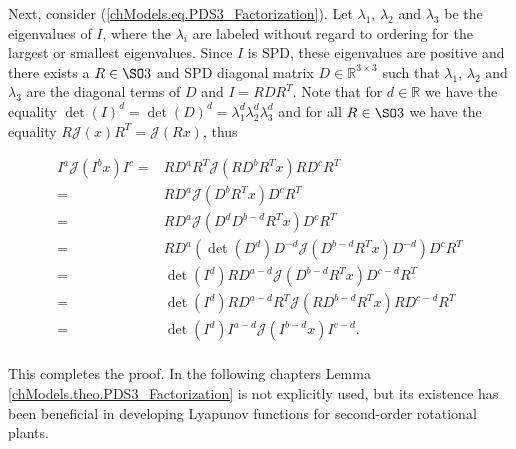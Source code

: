 \noindent Next, consider (\ref{chModels.eq.PDS3_Factorization}). Let $\lambda_1$,
$\lambda_2$ and $\lambda_3$ be the eigenvalues of $I$, where the
$\lambda_i$ are labeled without regard to ordering for the largest or
smallest eigenvalues. Since $I$ is \ac{SPD}, these eigenvalues are
positive and there exists a $R\in\SO3$ and \ac{SPD} diagonal matrix
$D\in\mathbb{R}^{3 \times 3}$ such that $\lambda_1$, $\lambda_2$ and
$\lambda_3$ are the diagonal terms of $D$ and $I=RDR^T$. Note that for
$d\in\mathbb{R}$ we have the equality
$\det(I)^d=\det(D)^d=\lambda_1^d\lambda_2^d\lambda_3^d$ and for all
$R\in\SO3$ we have the equality
$R\mathcal{J}\left(x\right)R^T=\mathcal{J}\left(Rx\right)$, thus

\begin{align}
I^a\mathcal{J}\left(I^b x\right)I^c
  =& RD^aR^T\mathcal{J}\left(RD^bR^T x\right)RD^cR^T
\nonumber \\
  =& RD^a\mathcal{J}\left(D^bR^T x\right)D^cR^T
\nonumber \\
  =& RD^a\mathcal{J}\left(D^dD^{b-d}R^T x\right)D^cR^T
\nonumber \\
  =& RD^a\left(\det\left(D^d\right)D^{-d}\mathcal{J}\left(D^{b-d}R^T x\right)D^{-d}\right)D^cR^T
\nonumber \\
  =&\det\left(I^d\right) RD^{a-d}\mathcal{J}\left(D^{b-d}R^T x\right)D^{c-d}R^T
\nonumber \\
  =&\det\left(I^d\right) RD^{a-d}R^T\mathcal{J}\left(R D^{b-d}R^T x\right)RD^{c-d}R^T
\nonumber \\
  =&\det\left(I^d\right) I^{a-d}\mathcal{J}\left(I^{b-d} x\right)I^{c-d}.
\nonumber \\
\end{align}

This completes the proof. In the following chapters Lemma
\ref{chModels.theo.PDS3_Factorization} is not explicitly used, but its
existence has been beneficial in developing Lyapunov functions for
second-order rotational plants.
